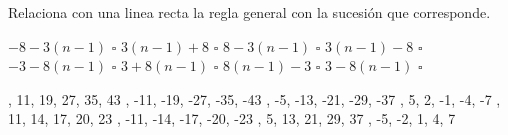 \question[10] Relaciona con una linea recta la regla general con la sucesión que corresponde.

\begin{multicols}{2}
    \begin{flushright}
        \begin{choices}
            \choice $-8 -3(n - 1)$ $\square$
            \choice $3(n - 1) + 8 $ $\square$
            \choice $8-3(n - 1) $ $\square$
            \choice $3(n - 1) - 8 $ $\square$
            \choice $-3-8(n - 1)$ $\square$
            \choice $3+8(n - 1)  $ $\square$
            \choice $8(n - 1)  -3$ $\square$
            \choice $3-8(n - 1) $ $\square$
        \end{choices}
    \end{flushright}

    \vspace{1cm}
    \begin{checkboxes}
        , 11, 19, 27, 35, 43       \vspace{0.2cm}
        , -11, -19, -27, -35, -43 \vspace{0.2cm}
        , -5, -13, -21, -29, -37   \vspace{0.2cm}
        , 5, 2, -1, -4, -7         \vspace{0.2cm}
        , 11, 14, 17, 20, 23       \vspace{0.2cm}
        , -11, -14, -17, -20, -23 \vspace{0.2cm}
        , 5, 13, 21, 29, 37       \vspace{0.2cm}
        , -5, -2, 1, 4, 7         \vspace{0.2cm}
    \end{checkboxes}
\end{multicols}



